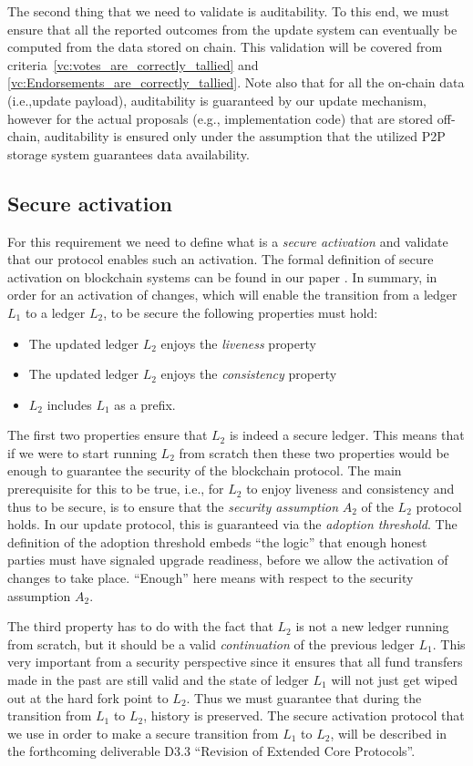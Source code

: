 The second thing that we need to validate is auditability. To this end, we must
ensure that all the reported outcomes from the update system can eventually be
computed from the data stored on chain. This validation will be covered from
criteria~\ref{vc:votes_are_correctly_tallied} and
\ref{vc:Endorsements_are_correctly_tallied}. Note also that for all the 
on-chain 
data (i.e.,update payload), auditability is guaranteed by our update mechanism, 
however for the 
actual proposals (e.g., implementation code) that are stored off-chain, 
auditability is ensured only under 
the assumption that the utilized P2P storage system guarantees data 
availability.


\subsection{Secure activation}\label{sec:secure_act}
For this requirement we need to  define what is a \emph{secure
	activation} and validate that our protocol enables such an activation. The
formal definition of secure activation on blockchain systems can be found in
our paper \cite{secure_activation}. In summary, in order for an activation of
changes, which will enable the transition from a ledger $L_1$ to a ledger $L_2$,
to be secure the following properties must hold:
\begin{itemize}
	\item The updated ledger $L_2$ enjoys the \emph{liveness} property
	\item The updated ledger $L_2$ enjoys the \emph{consistency} property
	\item $L_2$ includes $L_1$ as a prefix.
\end{itemize}

The first two properties ensure that $L_2$ is indeed a secure ledger. This
means that if we were to start running $L_2$ from scratch then these two
properties would be enough to guarantee the security of the blockchain
protocol. The main prerequisite for this to be true, i.e., for $L_2$ to enjoy
liveness and consistency and thus to be secure, is to ensure that the
\emph{security assumption} $A_2$ of the $L_2$ protocol holds. In our update
protocol, this is guaranteed via the \emph{adoption threshold}. The definition
of the adoption threshold embeds ``the logic'' that enough honest parties must
have signaled upgrade readiness, before we allow the activation of changes to
take place. ``Enough'' here means with respect to the security assumption $A_2$.

The third property has to do with the fact that $L_2$ is not a new ledger
running from scratch, but it should be a valid \emph{continuation} of the
previous ledger $L_1$. This very important from a security
perspective since it ensures that all fund transfers made in the past are still
valid and the state of ledger $L_1$ will not just get wiped out at the hard
fork point to $L_2$. Thus we must guarantee that during the transition from
$L_1$ to
$L_2$, history is preserved. The secure activation protocol 
that we use in order to make a secure transition from $L_1$ to 
$L_2$, will be described in the forthcoming deliverable D3.3 ``Revision 
of Extended Core Protocols''.

